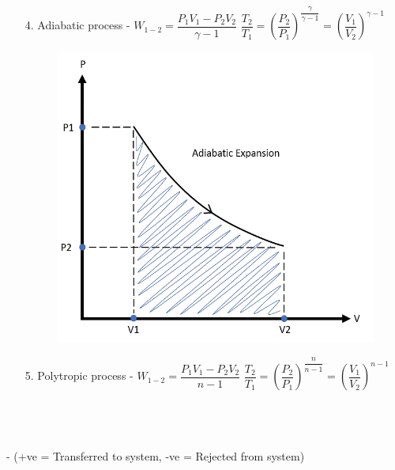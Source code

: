 \documentclass[8pt]{article}
\begin{document}
\begin{itemize}
\begin{figure}[H]
				\centering
			\end{figure}\hrulefill
		\item[4.] Adiabatic process - $\boxed{W_{1-2} = \dfrac{P_1V_1-P_2V_2}{\gamma -1}}$ $\boxed{\dfrac{T_2}{T_1}=\left(\dfrac{P_2}{P_1}\right)^{\dfrac{\gamma}{\gamma -1}}=\left(\dfrac{V_1}{V_2}\right)^{\gamma -1}}$
			\begin{figure}[H]
				\includegraphics[scale=0.3]{adiabatic.png}
				\centering
			\end{figure}\hrulefill
		\item[5.] Polytropic process - $\boxed{W_{1-2} = \dfrac{P_1V_1-P_2V_2}{n-1}}$ $\boxed{\dfrac{T_2}{T_1}=\left(\dfrac{P_2}{P_1}\right)^{\dfrac{n}{n-1}}=\left(\dfrac{V_1}{V_2}\right)^{n-1}}$
	\end{itemize}
	\hrulefill\\\\
\\ - (+ve = Transferred to system, -ve = Rejected from system)
\end{document}
